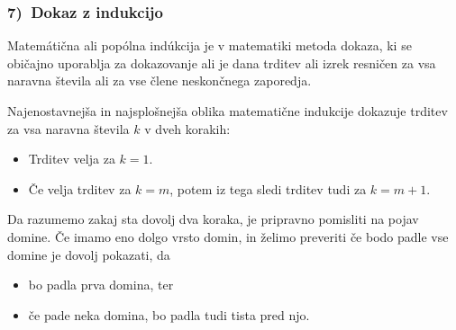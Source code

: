 \documentclass[11pt,paper=b5,footinclude,headinclude]{scrbook} %
\begin{document}
\begin{center}
\end{center}
\subsubsection*{7)~Dokaz z indukcijo}

Matemátična ali popólna indúkcija je v matematiki metoda dokaza, ki se običajno uporablja za dokazovanje ali je dana trditev ali izrek resničen za vsa naravna števila ali za vse člene neskončnega zaporedja. 

Najenostavnejša in najsplošnejša oblika matematične indukcije dokazuje trditev za vsa naravna števila $k$ v dveh korakih:

\begin{itemize}
    \item Trditev velja za $k = 1$.
    \item  Če velja trditev za $k = m$, potem iz tega sledi trditev tudi za $k = m + 1$.
\end{itemize}
Da razumemo zakaj sta dovolj dva koraka, je pripravno pomisliti na pojav domine. Če imamo eno dolgo vrsto domin, in želimo preveriti če bodo  padle vse domine  je dovolj pokazati, da
\begin{itemize}
    \item bo padla prva domina, ter
    \item če pade neka domina, bo padla tudi tista pred njo. 
\end{itemize}
\end{document}
